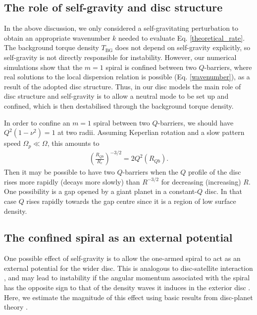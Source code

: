 

\subsection{The role of self-gravity and disc structure} 
In the above discussion, we only considered a self-gravitating
perturbation to obtain an appropriate wavenumber $k$ needed to
evaluate Eq. \ref{theoretical_rate}. 
The background torque density $T_\mathrm{BG}$ does not depend on  
self-gravity explicitly, so self-gravity is not directly
responsible for instability. However, 
our numerical simulations show that the $m=1$ spiral is
confined between two $Q$-barriers, where real solutions to the local
dispersion relation is possible (Eq. \ref{wavenumber}), as a result of the adopted disc
structure. Thus, in our disc models the main role of disc structure and self-gravity is to 
allow a neutral mode to be set up and confined, which is then
destabilised through the background torque density. 

In order to confine an $m=1$ spiral between two $Q$-barriers, we
should have $Q^2(1-\nu^2)=1$ at two radii. Assuming 
Keperlian rotation and a slow pattern speed $\Omega_p\ll\Omega$, this amounts to
\begin{align}
  \left(\frac{R_{Qb}}{R_c}\right)^{-3/2} = 2Q^2(R_{Qb}). 
\end{align}
Then it may be possible to have two $Q$-barriers when the $Q$ profile
of the disc rises more rapidly (decays more slowly) than $R^{-3/2}$
for decreasing (increasing) $R$. One possibility is a gap
opened by a giant planet in a constant-$Q$ disc. In that case $Q$
rises rapidly towards the gap centre since it is a region of low
surface density.  %






\subsection{The confined spiral as an external potential}
One possible effect of self-gravity is to allow the one-armed spiral  
to act as an external potential for the wider disc. This is
analogous to disc-satellite interaction 
\citep{goldreich79}, and may lead to instability 
if the angular momentum associated with the spiral has the opposite 
sign to that of the density waves it induces in the exterior disc
\citep{lin11b}. Here, we estimate the magnitude of this effect using
basic results from disc-planet theory \citep[see, e.g.][and references 
therein]{papaloizou07}. 

